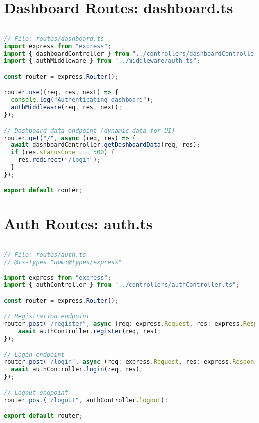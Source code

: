 \section{Dashboard Routes: dashboard.ts}
\begin{lstlisting}[language=TypeScript]

// File: routes/dashboard.ts
import express from "express";
import { dashboardController } from "../controllers/dashboardController.ts";
import { authMiddleware } from "../middleware/auth.ts";

const router = express.Router();

router.use((req, res, next) => {
  console.log("Authenticating dashboard");
  authMiddleware(req, res, next);
});

// Dashboard data endpoint (dynamic data for UI)
router.get("/", async (req, res) => {
  await dashboardController.getDashboardData(req, res);
  if (res.statusCode === 500) {
    res.redirect("/login");
  }
});

export default router;
\end{lstlisting}

\section{Auth Routes: auth.ts}
\begin{lstlisting}[language=TypeScript]

// File: routes/auth.ts
// @ts-types="npm:@types/express"

import express from "express";
import { authController } from "../controllers/authController.ts";

const router = express.Router();

// Registration endpoint
router.post("/register", async (req: express.Request, res: express.Response) => {
    await authController.register(req, res);
});

// Login endpoint
router.post("/login", async (req: express.Request, res: express.Response) => {
  await authController.login(req, res);
});

// Logout endpoint
router.post("/logout", authController.logout);

export default router;
\end{lstlisting}

